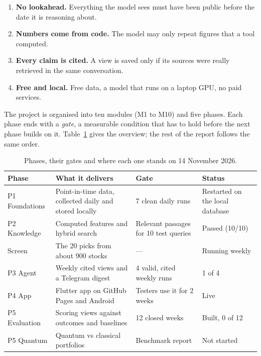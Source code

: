 \documentclass[11pt,a4paper]{article}
\begin{document}
\begin{enumerate}
  \item \textbf{No lookahead.} Everything the model sees must have been public before the date it is
        reasoning about.
  \item \textbf{Numbers come from code.} The model may only repeat figures that a tool computed.
  \item \textbf{Every claim is cited.} A view is saved only if its sources were really retrieved in the
        same conversation.
  \item \textbf{Free and local.} Free data, a model that runs on a laptop GPU, no paid services.
\end{enumerate}

The project is organised into ten modules (M1 to M10) and five phases. Each phase ends with a
\emph{gate}, a measurable condition that has to hold before the next phase builds on it.
Table~\ref{tab:phases} gives the overview; the rest of the report follows the same order.

\begin{table}[htbp]
\centering\small
\begin{tabularx}{\linewidth}{@{}l X X l@{}}
\toprule
Phase & What it delivers & Gate & Status \\
\midrule
P1 Foundations & Point-in-time data, collected daily and stored locally & 7 clean daily runs & Restarted on the local database \\
P2 Knowledge   & Computed features and hybrid search & Relevant passages for 10 test queries & Passed (10/10) \\
Screen         & The 20 picks from about 900 stocks & --- & Running weekly \\
P3 Agent       & Weekly cited views and a Telegram digest & 4 valid, cited weekly runs & 1 of 4 \\
P4 App         & Flutter app on GitHub Pages and Android & Testers use it for 2 weeks & Live \\
P5 Evaluation  & Scoring views against outcomes and baselines & 12 closed weeks & Built, 0 of 12 \\
P5 Quantum     & Quantum vs classical portfolios & Benchmark report & Not started \\
\bottomrule
\end{tabularx}
\caption{Phases, their gates and where each one stands on 14 November 2026.}
\label{tab:phases}
\end{table}

\end{document}
